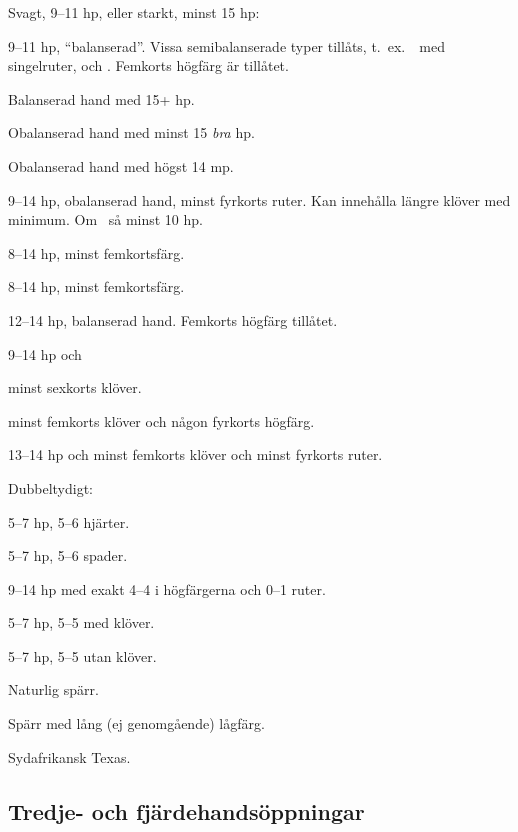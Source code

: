 \bbe
   \item[\kl{1}] Svagt, 9--11 hp, eller starkt, minst 15 hp: 
     \bnu
       \item 9--11 hp, ``balanserad''.  Vissa semibalanserade typer tillåts,
t.\ ex.\ \marmic\ med singelruter,  och .
Femkorts högfärg är tillåtet. 
       \item Balanserad hand med 15+ hp.
       \item Obalanserad hand med minst 15 \emph{bra} hp.
       \item Obalanserad hand med högst 14 mp.
     \enu

   \item[\ru{1}] 9--14 hp, obalanserad hand, minst fyrkorts ruter. Kan
               inneh{\aa}lla l\"angre kl\"over med minimum. Om \marmic\ så
               minst 10 hp.
   \item[\hj{1}] 8--14 hp, minst femkortsf\"arg.
   \item[\spa{1}] 8--14 hp, minst femkortsf\"arg.
   \item[\NT{1}] 12--14 hp, balanserad hand. Femkorts högfärg tillåtet.

   \item[\kl{2}] 9--14 hp och
    \bnu
       \item minst sexkorts kl\"over.
       \item minst femkorts kl\"over och n{\aa}gon fyrkorts h\"ogf\"arg.
       \item 13--14 hp och minst femkorts kl\"over och minst fyrkorts ruter.
    \enu

   \item[\ru{2}] Dubbeltydigt:
     \bnu
       \item 5--7 hp, 5--6 hjärter.
       \item 5--7 hp, 5--6 spader.
     \enu

   \item[\hj{2}] 9--14 hp med exakt 4--4 i högfärgerna och 0--1 ruter.

   \item[\spa{2}] 5--7 hp, 5--5 med klöver.
   \item[\NT{2}] 5--7 hp, 5--5 utan klöver.
   \item[\la{3}\ho{3}] Naturlig spärr.
   \item[\NT{3}] Sp\"arr med l{\aa}ng (ej genomg{\aa}ende) l{\aa}gf\"arg.
   \item[\la{4}] Sydafrikansk Texas.
\ebe

\subsection{Tredje- och fj{\"a}rdehands{\"o}ppningar}

